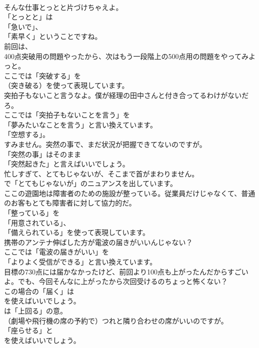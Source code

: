\documentclass[8pt]{extreport}
\begin{document}
\begin{CJK}{UTF8}{min}
\\	そんな仕事とっとと片づけちゃえよ。 
\\	「とっとと」は
\\	「急いで」、
\\	「素早く」ということですね。	
\\	前回は、
\\	400点突破用の問題やったから、次はもう一段階上の500点用の問題をやってみよっと。 
\\	ここでは「突破する」を
\\	（突き破る）を使って表現しています。	
\\	突拍子もないこと言うなよ。僕が経理の田中さんと付き合ってるわけがないだろ。 
\\	ここでは「突拍子もないことを言う」を
\\	「夢みたいなことを言う」と言い換えています。
\\	「空想する」。	
\\	すみません。突然の事で、まだ状況が把握できてないのですが。 
\\	「突然の事」はそのまま
\\	「突然起きた」と言えばいいでしょう。	
\\	忙しすぎて、とてもじゃないが、そこまで首がまわりません。 
\\	で「とてもじゃないが」のニュアンスを出しています。	
\\	ここの遊園地は障害者のための施設が整っている。従業員だけじゃなくて、普通のお客もとても障害者に対して協力的だ。 
\\	「整っている」を
\\	「用意されている」、
\\	「備えられている」を使って表現しています。	
\\	携帯のアンテナ伸ばした方が電波の届きがいいんじゃない？ 
\\	ここでは「電波の届きがいい」を
\\	「よりよく受信ができる」と言い換えています。	
\\	目標の730点には届かなかったけど、前回より100点も上がったんだからすごいよ。でも、今回そんなに上がったから次回受けるのちょっと怖くない？ 
\\	この場合の「届く」は
\\	を使えばいいでしょう。
\\	は「上回る」の意。	
\\	（劇場や飛行機の席の予約で）つれと隣り合わせの席がいいのですが。 
\\	「座らせる」と
\\	を使えばいいでしょう。

\end{CJK}
\end{document}
